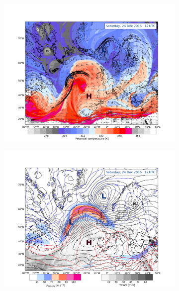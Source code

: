\begin{figure}[ht!]%
	\centering
	\begin{subfigure}[b]{0.49\textwidth}
		\includegraphics[trim={4.2cm 0cm 4.3cm 5.1cm},clip,
		width=\textwidth]{./fig_DynTropo/20161224_12}
		\caption{} \label{fig:DT24}
	\end{subfigure}
	\begin{subfigure}[b]{0.49\textwidth}
		\includegraphics[trim={4.2cm 0cm 4.3cm 5.1cm},clip,
		width=\textwidth]{./fig_Geopot_Jet/20161224_12}
		\caption{} \label{fig:GP24}
	\end{subfigure}

\end{figure}

